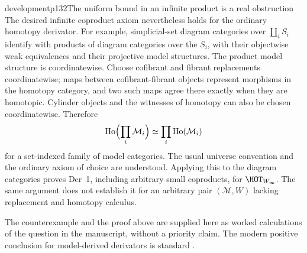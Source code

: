 \begin{dcomment}{development}{p132}{The uniform bound in an infinite product is a real obstruction}
The desired infinite coproduct axiom nevertheless holds for the ordinary homotopy derivator. For example, simplicial-set diagram categories over $\coprod_iS_i$ identify with products of diagram categories over the $S_i$, with their objectwise weak equivalences and their projective model structures. The product model structure is coordinatewise. Choose cofibrant and fibrant replacements coordinatewise; maps between cofibrant-fibrant objects represent morphisms in the homotopy category, and two such maps agree there exactly when they are homotopic. Cylinder objects and the witnesses of homotopy can also be chosen coordinatewise. Therefore
\[
 \operatorname{Ho}\Bigl(\prod_i\mathcal M_i\Bigr)
   \simeq\prod_i\operatorname{Ho}(\mathcal M_i)
\]
for a set-indexed family of model categories. The usual universe convention and the ordinary axiom of choice are understood. Applying this to the diagram categories proves Der~1, including arbitrary small coproducts, for $\HOT_{W_\infty}$. The same argument does not establish it for an arbitrary pair $(\mathcal M,W)$ lacking replacement and homotopy calculus.

The counterexample and the proof above are supplied here as worked calculations of the question in the manuscript, without a priority claim. The modern positive conclusion for model-derived derivators is standard \citep[Proposition~1.30]{Groth2013}.
\end{dcomment}

